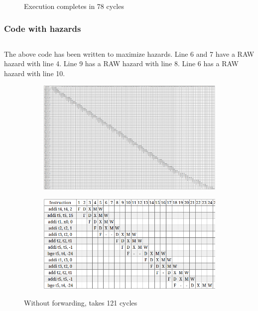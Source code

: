 \documentclass[11pt]{article}
\newenvironment{codeblock}{\captionsetup{type=codelisting}}{}
\begin{document}
\begin{figure}[H]
\begin{subfigure}{.5\textwidth}
\end{subfigure}
\caption{Execution completes in 78 cycles}
\end{figure}

\newpage

\subsubsection{Code with hazards}
\begin{codeblock}
\inputminted[breaklines,
 mathescape,
 linenos,
 numbersep=5pt,
 frame=single,
 xleftmargin=0pt]{asm}{q1/fib-bdex-bad.S}
\end{codeblock}
The above code has been written to maximize hazards. Line 6 and 7 have a RAW hazard with line 4. Line 9 has a RAW hazard with line 8. Line 6 has a RAW hazard with line 10.

\begin{figure}[H]
\begin{subfigure}{.5\textwidth}
  \centering
  \includegraphics[width=\linewidth]{q1/bex/bad/nof-121.png}
\end{subfigure}
\begin{subfigure}{.5\textwidth}
  \centering
  \includegraphics[width=\linewidth]{q1/bex/bad/nof-loop.png}
\end{subfigure}
\caption{Without forwarding, takes 121 cycles}
\end{figure}
\end{document}
